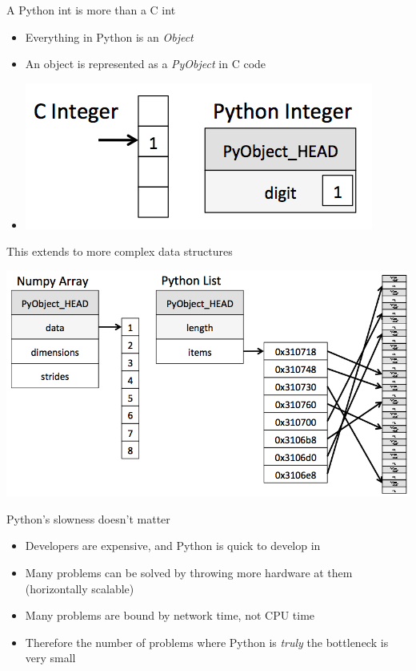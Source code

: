 \documentclass[12pt, aspectration=169]{beamer}
\begin{document}
    \begin{frame}{A Python int is more than a C int}
        \begin{itemize}
            \item Everything in Python is an \textit{Object}
            \item An object is represented as a \textit{PyObject} in C code
            \item[] \begin{center}
                      \includegraphics[scale=0.5]{static/images/cint_vs_pyint}
            \end{center}
        \end{itemize}
    \end{frame}

    \begin{frame}{This extends to more complex data structures}
        \begin{center}
              \includegraphics[scale=0.25]{static/images/array_vs_list}
        \end{center}
    \end{frame}

    \begin{frame}{Python's slowness doesn't matter}
        \begin{itemize}
            \item Developers are expensive, and Python is quick to develop in
            \item Many problems can be solved by throwing more hardware at them (horizontally scalable)
            \item Many problems are bound by network time, not CPU time
            \item Therefore the number of problems where Python is \textit{truly} the bottleneck is very small
        \end{itemize}
    \end{frame}
\end{document}
